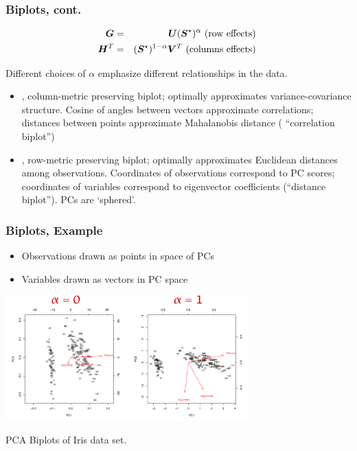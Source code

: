 \documentclass{beamer}
\begin{document}
\begin{frame}
  \frametitle{Biplots, cont.}

\begin{eqnarray*}
\bm{G} &=& \bm{U}(\bm{S}^{\star})^{\alpha} \text{ (row effects) } \\
\bm{H}^T &=& (\bm{S}^{\star})^{1-\alpha} \bm{V}^T \text{ (columns effects) }
\end{eqnarray*}

Different choices of $\alpha$ emphasize different relationships in the data.

\begin{itemize}
\item {}, column-metric preserving biplot; optimally approximates variance-covariance structure. Cosine of angles between vectors approximate correlations; distances between points approximate Mahalanobis distance ( ``correlation biplot'')
\item {}, row-metric preserving biplot; optimally approximates Euclidean distances among observations. Coordinates of observations correspond to PC scores; coordinates of variables correspond to eigenvector coefficients (``distance biplot''). PCs are `sphered'.
\end{itemize}

\end{frame}


\begin{frame}
  \frametitle{Biplots, Example}

\begin{itemize}
\item Observations drawn as points in space of PCs
\item Variables drawn as vectors in PC space
\end{itemize}

\medskip

\centerline{
\includegraphics[height=1.9in]{fig-irisbiplot-simple.pdf}
}
\begin{center}
PCA Biplots of Iris data set.
\end{center}

\end{frame}
\end{document}
